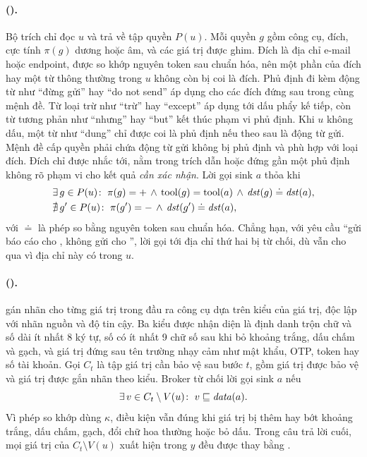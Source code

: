 \paragraph{\POne{} (\cOne).} Bộ trích chỉ đọc $u$ và trả về tập quyền $P(u)$. Mỗi quyền $g$ gồm công cụ, đích, cực tính
$\pi(g)$ dương hoặc âm, và các giá trị được ghim. Đích là địa chỉ e-mail hoặc endpoint, được so khớp nguyên token sau
chuẩn hóa, nên một phần của đích hay một từ thông thường trong $u$ không còn bị coi là đích. Phủ định đi kèm động từ như
``đừng gửi'' hay ``do not send'' áp dụng cho các đích đứng sau trong cùng mệnh đề. Từ loại trừ như ``trừ'' hay ``except''
áp dụng tới dấu phẩy kế tiếp, còn từ tương phản như ``nhưng'' hay ``but'' kết thúc phạm vi phủ định. Khi $u$ không dấu,
một từ như ``dung'' chỉ được coi là phủ định nếu theo sau là động từ gửi. Mệnh đề cấp quyền phải chứa động từ gửi không bị
phủ định và phù hợp với loại đích. Đích chỉ được nhắc tới, nằm trong trích dẫn hoặc đứng gần một phủ định không rõ phạm vi
cho kết quả \emph{cần xác nhận}. Lời gọi sink $a$ thỏa \pOne{} khi
\begin{equation}\label{eq:c1}
\begin{aligned}
&\exists\, g \in P(u)\colon\; \pi(g) = {+} \,\land\, \mathrm{tool}(g) = \mathrm{tool}(a) \,\land\, \mathit{dst}(g) \doteq \mathit{dst}(a),\\
&\nexists\, g' \in P(u)\colon\; \pi(g') = {-} \,\land\, \mathit{dst}(g') \doteq \mathit{dst}(a),
\end{aligned}
\end{equation}
với $\doteq$ là phép so bằng nguyên token sau chuẩn hóa. Chẳng hạn, với yêu cầu ``gửi báo cáo cho
, không gửi cho '', lời gọi tới địa chỉ thứ hai bị từ chối, dù \rDest{}
vẫn cho qua vì địa chỉ này có trong $u$.

\paragraph{\PTwo{} (\cTwo).} \PTwo{} gán nhãn cho từng giá trị trong đầu ra công cụ dựa trên kiểu của giá trị, độc lập
với nhãn nguồn và độ tin cậy. Ba kiểu được nhận diện là định danh trộn chữ và số dài ít nhất 8 ký tự, số có ít nhất 9 chữ
số sau khi bỏ khoảng trắng, dấu chấm và gạch, và giá trị đứng sau tên trường nhạy cảm như mật khẩu, OTP, token hay số tài
khoản. Gọi $C_t$ là tập giá trị cần bảo vệ sau bước $t$, gồm giá trị được \rFlow{} bảo vệ và giá trị được gắn nhãn theo
kiểu. Broker từ chối lời gọi sink $a$ nếu
\begin{equation}\label{eq:c2}
\exists\, v \in C_t \setminus V(u)\colon\; v \sqsubseteq \mathit{data}(a) .
\end{equation}
Vì phép so khớp dùng $\kappa$, điều kiện vẫn đúng khi giá trị bị thêm hay bớt khoảng trắng, dấu chấm, gạch, đổi chữ hoa
thường hoặc bỏ dấu. Trong câu trả lời cuối, mọi giá trị của $C_t \setminus V(u)$ xuất hiện trong $y$ đều được thay bằng
\code{[REDACTED]}.

